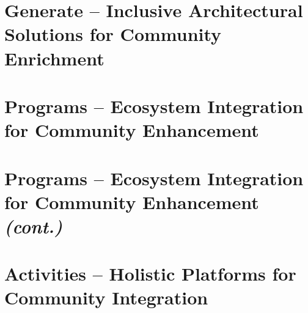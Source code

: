\section*{
  Generate -- Inclusive Architectural Solutions for Community Enrichment
 }
\noindent
\begin{minipage}[t]{\linewidth}
	\hspace*{\fill}
	\begin{minipage}[t]{0.325\linewidth}
		
	\end{minipage}
	\begin{minipage}[t]{0.325\linewidth}
		
	\end{minipage}
	\begin{minipage}[t]{0.325\linewidth}
		
	\end{minipage}
	\hspace*{\fill}
	\newline%
	\hspace*{\fill}
	\begin{minipage}[t]{0.325\linewidth}
		
	\end{minipage}
	\begin{minipage}[t]{0.325\linewidth}
		
	\end{minipage}
	\hspace*{\fill}
\end{minipage}
\vspace{1.0cm}%
\section*{
  Programs -- Ecosystem Integration for Community Enhancement
 }
\vspace{0.5cm}%

\vfill
\columnbreak%
\begin{minipage}[t][\textheight][t]{\linewidth}
	\section*{
	  Programs -- Ecosystem Integration for Community Enhancement \textit{(cont.)}
	 }
	
	\vfill
	\section*{
	  Activities -- Holistic Platforms for Community Integration
	 }
	
	\vfill
	
\end{minipage}
\EndTwoColumnLayout
\newpage
